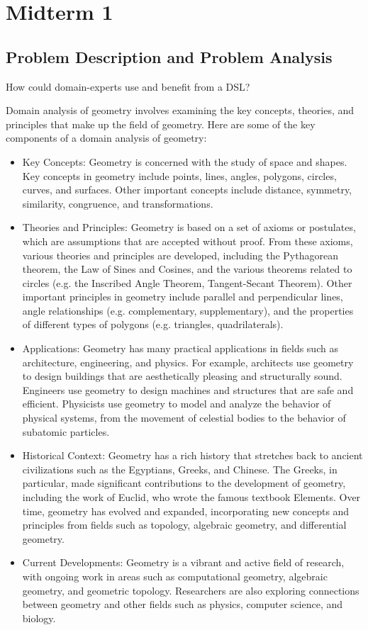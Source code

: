 \chapter{Midterm 1}
\section{Problem Description and Problem Analysis}

\noindent How could domain-experts use and benefit from a DSL?

\noindent Domain analysis of geometry involves examining the key concepts, theories, and principles that make up the field of geometry. 
\noindent Here are some of the key components of a domain analysis of geometry:
\begin{itemize}
\item Key Concepts: Geometry is concerned with the study of space and shapes. Key concepts in geometry include points, lines, angles, polygons, circles, curves, and surfaces. Other important concepts include distance, symmetry, similarity, congruence, and transformations.

\item Theories and Principles: Geometry is based on a set of axioms or postulates, which are assumptions that are accepted without proof. From these axioms, various theories and principles are developed, including the Pythagorean theorem, the Law of Sines and Cosines, and the various theorems related to circles (e.g. the Inscribed Angle Theorem, Tangent-Secant Theorem). Other important principles in geometry include parallel and perpendicular lines, angle relationships (e.g. complementary, supplementary), and the properties of different types of polygons (e.g. triangles, quadrilaterals).

\item Applications: Geometry has many practical applications in fields such as architecture, engineering, and physics. For example, architects use geometry to design buildings that are aesthetically pleasing and structurally sound. Engineers use geometry to design machines and structures that are safe and efficient. Physicists use geometry to model and analyze the behavior of physical systems, from the movement of celestial bodies to the behavior of subatomic particles.

\item Historical Context: Geometry has a rich history that stretches back to ancient civilizations such as the Egyptians, Greeks, and Chinese. The Greeks, in particular, made significant contributions to the development of geometry, including the work of Euclid, who wrote the famous textbook Elements. Over time, geometry has evolved and expanded, incorporating new concepts and principles from fields such as topology, algebraic geometry, and differential geometry.

\item Current Developments: Geometry is a vibrant and active field of research, with ongoing work in areas such as computational geometry, algebraic geometry, and geometric topology. Researchers are also exploring connections between geometry and other fields such as physics, computer science, and biology.
\end{itemize}


